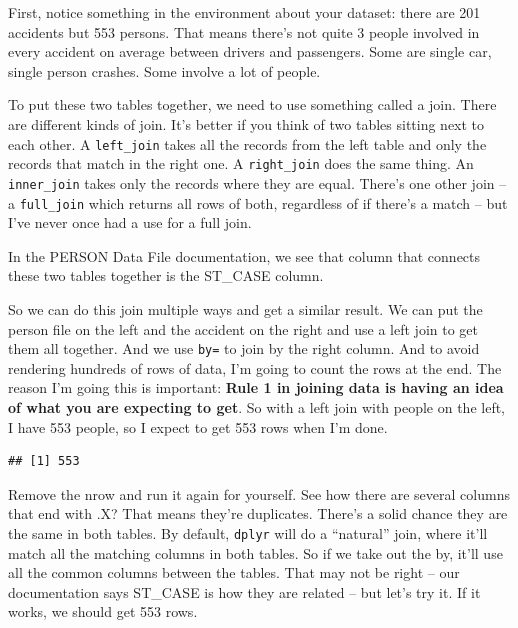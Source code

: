 \documentclass[]{book}
\newenvironment{Shaded}{\begin{snugshade}}{\end{snugshade}}
\newcommand{\DataTypeTok}[1]{\textcolor[rgb]{0.13,0.29,0.53}{#1}}
\newcommand{\KeywordTok}[1]{\textcolor[rgb]{0.13,0.29,0.53}{\textbf{#1}}}
\newcommand{\NormalTok}[1]{#1}
\newcommand{\OperatorTok}[1]{\textcolor[rgb]{0.81,0.36,0.00}{\textbf{#1}}}
\newcommand{\StringTok}[1]{\textcolor[rgb]{0.31,0.60,0.02}{#1}}
\begin{document}
First, notice something in the environment about your dataset: there are 201 accidents but 553 persons. That means there's not quite 3 people involved in every accident on average between drivers and passengers. Some are single car, single person crashes. Some involve a lot of people.

To put these two tables together, we need to use something called a join. There are different kinds of join. It's better if you think of two tables sitting next to each other. A \texttt{left\_join} takes all the records from the left table and only the records that match in the right one. A \texttt{right\_join} does the same thing. An \texttt{inner\_join} takes only the records where they are equal. There's one other join -- a \texttt{full\_join} which returns all rows of both, regardless of if there's a match -- but I've never once had a use for a full join.

In the PERSON Data File documentation, we see that column that connects these two tables together is the ST\_CASE column.

So we can do this join multiple ways and get a similar result. We can put the person file on the left and the accident on the right and use a left join to get them all together. And we use \texttt{by=} to join by the right column. And to avoid rendering hundreds of rows of data, I'm going to count the rows at the end. The reason I'm going this is important: \textbf{Rule 1 in joining data is having an idea of what you are expecting to get}. So with a left join with people on the left, I have 553 people, so I expect to get 553 rows when I'm done.

\begin{Shaded}
\end{Shaded}

\begin{verbatim}
## [1] 553
\end{verbatim}

Remove the nrow and run it again for yourself. See how there are several columns that end with .X? That means they're duplicates. There's a solid chance they are the same in both tables. By default, \texttt{dplyr} will do a ``natural'' join, where it'll match all the matching columns in both tables. So if we take out the by, it'll use all the common columns between the tables. That may not be right -- our documentation says ST\_CASE is how they are related -- but let's try it. If it works, we should get 553 rows.
\end{document}
